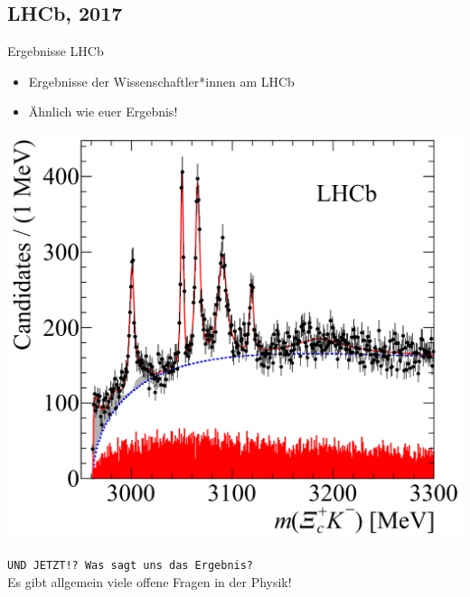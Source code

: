 \subsection{LHCb, 2017}
\begin{frame}{Ergebnisse LHCb}
 \begin{minipage}{0.49\textwidth}
 \begin{itemize}
        \item<1-> Ergebnisse der Wissenschaftler*innen am LHCb \hspace{2cm }
        \item<1-> Ähnlich wie euer Ergebnis!
    \end{itemize}

\end{minipage}\begin{minipage}{0.49\textwidth}

\includegraphics[width=\textwidth]{Figures Discussion/Result_OmegaC_spectrum_LHCb.png}
\end{minipage}

\begin{center}
   \texttt{UND JETZT!? Was sagt uns das Ergebnis?} \\ 
        Es gibt allgemein viele offene Fragen in der Physik! 
\end{center}
    
\end{frame}
